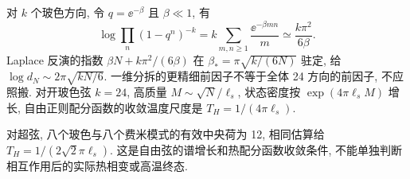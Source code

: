 对 $k$ 个玻色方向, 令 $q=\ee^{-\beta}$ 且 $\beta\ll1$, 有
\[
 \log\prod_n(1-q^n)^{-k}
 =k\sum_{m,n\geq1}\frac{\ee^{-\beta mn}}m
 \simeq\frac{k\pi^2}{6\beta}.
\]
Laplace 反演的指数 $\beta N+k\pi^2/(6\beta)$ 在
$\beta_* =\pi\sqrt{k/(6N)}$ 驻定, 给 $\log d_N\sim2\pi\sqrt{kN/6}$. 一维分拆的更精细前因子不等于全体 24 方向的前因子, 不应照搬. 对开玻色弦 $k=24$, 高质量 $M\sim\sqrt{N}/\ell_s$, 状态密度按 $\exp(4\pi\ell_sM)$ 增长, 自由正则配分函数的收敛温度尺度是 $T_H=1/(4\pi\ell_s)$.

对超弦, 八个玻色与八个费米模式的有效中央荷为 12, 相同估算给 $T_H=1/(2\sqrt2\pi\ell_s)$. 这是自由弦的谱增长和热配分函数收敛条件, 不能单独判断相互作用后的实际热相变或高温终态.
